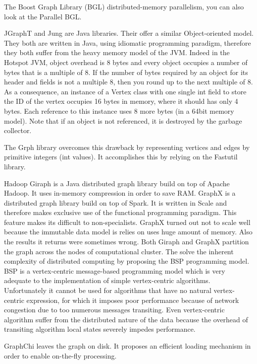 \documentclass[11pt,a4paper]{article}
\begin{document}
The Boost Graph Library (BGL)
distributed-memory parallelism, you can also look at the Parallel BGL. 

JGraphT and Jung are Java libraries. Their offer a similar Object-oriented model. They both are written in Java, using idiomatic programming paradigm, therefore they both suffer from  the heavy memory model of the JVM. Indeed in the Hotspot JVM, object overhead is 8 bytes and every object occupies a number of bytes that is a multiple of 8. If the number of bytes required by an object for its header and fields is not a multiple 8, then you round up to the next multiple of 8. As a consequence, an instance of a Vertex class with one single int field to store the ID of the vertex  occupies 16 bytes in memory, where it should has only 4 bytes. Each reference to this instance uses 8 more bytes (in a 64bit memory model). Note that if an object is not referenced, it is destroyed by the garbage collector.

The Grph library overcomes this drawback by representing vertices and edges by primitive integers (int values). It accomplishes this by relying on the Fastutil library. 

Hadoop Giraph is a Java distributed graph library build on top of Apache Hadoop. It uses in-memory compression in order to save RAM.
GraphX is a distributed graph library build on top of Spark. It is written in Scale and therefore makes exclusive use of the functional programming paradigm. This feature makes its difficult to non-specialists. GraphX turned out not to scale well because the immutable data model is relies on uses huge amount of memory. Also the results it returns were sometimes wrong.
Both Giraph and GraphX partition the graph across the nodes of computational cluster. The solve the inherent complexity of distributed computing by proposing the BSP programming model. BSP is a vertex-centric message-based programming model which is very adequate to the implementation of simple vertex-centric algorithms. Unfortunately it cannot be used for algorithms that have no natural vertex-centric expression, for which it imposes poor performance because of network congestion due to too numerous messages transiting.
Even vertex-centric algorithm suffer from the distributed nature of the data because the overhead of transiting algorithm local states severely impedes performance.

GraphChi leaves the graph on disk. It proposes an efficient loading mechanism in order to enable on-the-fly processing.
\end{document}
